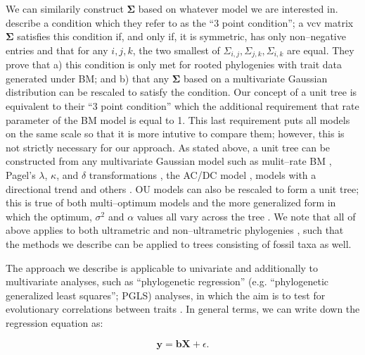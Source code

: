 \documentclass[a4paper,12pt]{article}
\begin{document}
We can similarily construct $\mathbf{\Sigma}$ based on whatever model we are interested in. \citet{HoAne2013} describe a condition which they refer to as the ``3 point condition''; a vcv matrix $\mathbf{\Sigma}$ satisfies this condition if, and only if, it is symmetric, has only non--negative entries and that for any $i,j,k$, the two smallest of $\Sigma_{i,j}, \Sigma_{j,k}, \Sigma_{i,k}$ are equal. They prove that a) this condition is only met for rooted phylogenies with trait data generated under BM; and b) that any $\mathbf{\Sigma}$ based on a multivariate Gaussian distribution can be rescaled to satisfy the condition. Our concept of a unit tree is equivalent to their ``3 point condition'' which the additional requirement that rate parameter of the BM model is equal to 1. This last requirement puts all models on the same scale so that it is more intutive to compare them; however, this is not strictly necessary for our approach. As stated above, a unit tree can be constructed from any multivariate Gaussian model such as mulit--rate BM \citep{Omeara2006, Thomas2006, Eastman2011, Revell2012, Motmot}, Pagel's $\lambda$, $\kappa$, and $\delta$ transformations \citep{Pagel1997, Pagel1999}, the AC/DC model \citep{Blomberg2003} \citep[a.k.a. `EB';][]{Harmon2010, SlaterPennell}, models with a directional trend \citep{Hunt2007} and others \citep[e.g.][]{SlaterMEE}. OU models can also be rescaled to form a unit tree; this is true of both multi--optimum \citep{ButlerKing2004} models and the more generalized form \citep{Beaulieu2012, IngramMahler, UyedaBayou} in which the optimum, $\sigma^2$ and $\alpha$ values all vary across the tree \citep{HoAne2013}. We note that all of above applies to both ultrametric and non--ultrametric phylogenies \citep{HoAne2013}, such that the methods we describe can be applied to trees consisting of fossil taxa as well.

The approach we describe is applicable to univariate and additionally to multivariate analyses, such as ``phylogenetic regression'' (e.g. ``phylogenetic generalized least squares''; PGLS) analyses, in which the aim is to test for evolutionary correlations between traits \citep{Grafen1989, Rohlf2001}. In general terms, we can write down the regression equation as:

\begin{equation}
\mathbf{y} = \mathbf{b}\mathbf{X} + \epsilon .
\end{equation}
\end{document}
